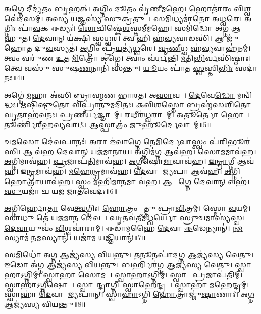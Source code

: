 𑌅\ul{𑌗𑍍𑌨𑍇} 𑌦𑍀𑌦𑍍𑌯॑𑌤𑌂 \ul{𑌬𑍃}𑌹𑌤𑍍।
\ul{𑌅}𑌗𑍍𑌨𑌿𑌂 \ul{𑌦𑍂}𑌤𑌂 𑌵𑍃॑𑌣𑍀𑌮𑌹𑍇।
𑌹𑍋𑌤𑌾॑𑌰𑌂 \ul{𑌵𑌿}𑌶𑍍𑌵𑌵𑍇॑𑌦𑌸𑌮𑍍।
\ul{𑌅}𑌸𑍍𑌯 \ul{𑌯}𑌜𑍍𑌞𑌸𑍍𑌯॑ \ul{𑌸𑍁}𑌕𑍍𑌰𑌤𑍁𑌮𑍍᳚।
\ul{𑌸}\ul{𑌮𑌿}𑌧𑍍𑌯𑌮𑌾॑𑌨𑍋 𑌅\ul{𑌧𑍍𑌵}𑌰𑍇।
\ul{𑌅}𑌗𑍍𑌨𑌿𑌃 𑌪𑌾॑\ul{𑌵}𑌕 𑌈𑌡𑍍𑌯𑌃॑।
\ul{𑌶𑍋}𑌚𑌿𑌷𑍍𑌕𑍇॑\ul{𑌶}𑌸𑍍𑌤𑌮𑍀॑𑌮𑌹𑍇।
𑌸𑌮𑌿॑𑌦𑍍𑌧𑍋 𑌅𑌗𑍍𑌨 𑌆𑌹𑍁𑌤।
\ul{𑌦𑍇}𑌵𑌾𑌨𑍍 𑌯॑𑌕𑍍𑌷𑌿 𑌸𑍍𑌵𑌧𑍍𑌵𑌰।
𑌤𑍍𑌵 𑌹𑌿 𑌹॑\ul{𑌵𑍍𑌯}𑌵𑌾𑌡𑌸𑌿॑।
𑌆 𑌜𑍁॑𑌹𑍋𑌤 𑌦𑍁\ul{𑌵}𑌸𑍍𑌯𑌤॑।
\ul{𑌅}𑌗𑍍𑌨𑌿𑌂 𑌪𑍍𑌰॑\ul{𑌯}𑌤𑍍𑌯॑\ul{𑌧𑍍𑌵}𑌰𑍇।
\ul{𑌵𑍃}\ul{𑌣𑍀}𑌧𑍍𑌵 𑌹॑\ul{𑌵𑍍𑌯}𑌵𑌾𑌹॑𑌨𑌮𑍍।
𑌤𑍍𑌵𑌂 𑌵𑌰𑍁॑𑌣 \ul{𑌉}𑌤 \ul{𑌮𑌿}𑌤𑍍𑌰𑍋 𑌅॑𑌗𑍍𑌨𑍇।
𑌤𑍍𑌵𑌾𑌂 𑌵॑𑌰𑍍𑌧𑌨𑍍𑌤𑌿 \ul{𑌮}𑌤𑌿\ul{𑌭𑌿}𑌰𑍍𑌵𑌸𑌿॑𑌷𑍍𑌠𑌾𑌃।
𑌤𑍍𑌵𑍇 𑌵𑌸𑍁॑ 𑌸𑍁𑌷\ul{𑌣}𑌨𑌾𑌨𑌿॑ 𑌸𑌨𑍍𑌤𑍁।
\ul{𑌯𑍂}𑌯𑌂 𑌪𑌾॑𑌤 \ul{𑌸𑍍𑌵}𑌸𑍍𑌤𑌿\ul{𑌭𑌿𑌃} 𑌸𑌦𑌾॑ 𑌨𑌃॥4॥\anuvakamend[\ul{𑌶𑍍𑌰}𑌵𑌾𑌯𑍍𑌯॑𑌮𑌿𑌧𑍀\ul{𑌮}𑌹𑍍𑌯𑌸𑌿॑ \ul{𑌸}𑌪𑍍𑌤 𑌚॑]

𑌅𑌗𑍍𑌨𑍇॑ \ul{𑌮}𑌹𑌾 𑌅॑𑌸𑌿 𑌬𑍍𑌰𑌾𑌹𑍍𑌮𑌣 𑌭𑌾𑌰𑌤।
𑌅\ul{𑌸𑌾}𑌵𑌸𑍗᳚।
\ul{𑌦𑍇}𑌵𑍇\ul{𑌦𑍍𑌧𑍋} 𑌮𑌨𑍍𑌵𑌿॑𑌦𑍍𑌧𑌃।
𑌋𑌷𑌿॑𑌷𑍍𑌟𑍁\ul{𑌤𑍋} 𑌵𑌿𑌪𑍍𑌰𑌾॑𑌨𑍁𑌮𑌦𑌿𑌤𑌃।
\ul{𑌕}\ul{𑌵𑌿}\ul{𑌶}𑌸𑍍𑌤𑍋 𑌬𑍍𑌰𑌹𑍍𑌮॑𑌸𑌶𑌿𑌤𑍋 \ul{𑌘𑍃}𑌤𑌾𑌹॑𑌵𑌨𑌃।
\ul{𑌪𑍍𑌰}𑌣𑍀\ul{𑌰𑍍𑌯}𑌜𑍍𑌞𑌾𑌨𑌾᳚𑌮𑍍।
\ul{𑌰}𑌥𑍀𑌰॑\ul{𑌧𑍍𑌵}𑌰𑌾𑌣𑌾᳚𑌮𑍍।
\ul{𑌅}𑌤𑍂\ul{𑌰𑍍𑌤𑍋} 𑌹𑍋𑌤𑌾᳚।
𑌤𑍂𑌰𑍍𑌣𑌿॑𑌰𑍍‌\mbox{}𑌹\ul{𑌵𑍍𑌯}𑌵𑌾𑌟𑍍।
𑌆𑌸𑍍𑌪𑌾𑌤𑍍𑌰𑌂॑ \ul{𑌜𑍁}𑌹𑍂\ul{𑌰𑍍𑌦𑍇}𑌵𑌾𑌨𑌾᳚𑌮𑍍॥5॥

\ul{𑌚}\ul{𑌮}𑌸𑍋 𑌦𑍇॑\ul{𑌵}𑌪𑌾𑌨𑌃॑।
\ul{𑌅}𑌰𑌾 𑌇॑𑌵𑌾𑌗𑍍𑌨𑍇 \ul{𑌨𑍇}𑌮𑌿\ul{𑌰𑍍𑌦𑍇}𑌵𑌾𑌸𑍍𑌤𑍍𑌵𑌂 𑌪॑\ul{𑌰𑌿}𑌭𑍂𑌰॑𑌸𑌿।
𑌆 𑌵॑𑌹 \ul{𑌦𑍇}𑌵𑌾𑌨𑍍 𑌯𑌜॑𑌮𑌾𑌨𑌾𑌯।
\ul{𑌅}𑌗𑍍𑌨𑌿𑌮॑\ul{𑌗𑍍𑌨} 𑌆𑌵॑𑌹।
𑌸𑍋\ul{𑌮}𑌮𑌾𑌵॑𑌹।
\ul{𑌅}𑌗𑍍𑌨𑌿𑌮𑌾𑌵॑𑌹।
\ul{𑌪𑍍𑌰}𑌜𑌾𑌪॑\ul{𑌤𑌿}𑌮𑌾𑌵॑𑌹।
\ul{𑌅}𑌗𑍍𑌨𑍀𑌷𑍋\ul{𑌮𑌾}𑌵𑌾𑌵॑𑌹।
\ul{𑌇}\ul{𑌨𑍍𑌦𑍍𑌰𑌾}𑌗𑍍𑌨𑍀 𑌆𑌵॑𑌹।
𑌇\ul{𑌨𑍍𑌦𑍍𑌰}𑌮𑌾𑌵॑𑌹।
\ul{𑌮}\ul{𑌹𑍇}𑌨𑍍𑌦𑍍𑌰𑌮𑌾𑌵॑𑌹।
\ul{𑌦𑍇}𑌵𑌾 𑌆᳚\ul{𑌜𑍍𑌯}𑌪𑌾 𑌆𑌵॑𑌹।
\ul{𑌅}𑌗𑍍𑌨𑌿 \ul{𑌹𑍋}𑌤𑍍𑌰𑌾𑌯𑌾𑌵॑𑌹।
𑌸𑍍𑌵𑌂 𑌮॑\ul{𑌹𑌿}𑌮𑌾\ul{𑌨}𑌮𑌾 𑌵॑𑌹।
𑌆 𑌚𑌾᳚𑌗𑍍𑌨𑍇 \ul{𑌦𑍇}𑌵𑌾𑌨𑍍 𑌵𑌹॑।
\ul{𑌸𑍁}𑌯𑌜𑌾॑ 𑌚 𑌯𑌜 𑌜𑌾𑌤𑌵𑍇𑌦𑌃॥6॥\anuvakamend[\ul{𑌦𑍇}𑌵𑌾\ul{𑌨𑌾}𑌮𑌿\ul{𑌨𑍍𑌦𑍍𑌰}𑌮𑌾 𑌵॑\ul{𑌹} 𑌷𑌟𑍍 𑌚॑]

\ul{𑌅}𑌗𑍍𑌨𑌿𑌰𑍍\mbox{}𑌹𑍋\ul{𑌤𑌾} 𑌵𑍇\ul{𑌤𑍍𑌵}𑌗𑍍𑌨𑌿𑌃।
\ul{𑌹𑍋}𑌤𑍍𑌰𑌂 𑌵𑍇᳚𑌤𑍍𑌤𑍁 𑌪𑍍𑌰𑌾\ul{𑌵𑌿}𑌤𑍍𑌰𑌮𑍍।
𑌸𑍍𑌮𑍋 \ul{𑌵}𑌯𑌮𑍍।
\ul{𑌸𑌾}𑌧𑍁 𑌤𑍇॑ 𑌯𑌜𑌮𑌾𑌨 \ul{𑌦𑍇}𑌵𑌤𑌾᳚।
\ul{𑌘𑍃}𑌤𑌵॑𑌤𑍀𑌮𑌧𑍍𑌵\ul{𑌰𑍍𑌯𑍋} 𑌸𑍍𑌰𑍁\ul{𑌚}𑌮𑌾𑌸𑍍𑌯॑𑌸𑍍𑌵।
\ul{𑌦𑍇}\ul{𑌵𑌾}𑌯𑍁𑌵𑌂॑ \ul{𑌵𑌿}𑌶𑍍𑌵𑌵𑌾॑𑌰𑌾𑌮𑍍।
𑌈𑌡𑌾॑𑌮𑌹𑍈 \ul{𑌦𑍇}𑌵𑌾 \ul{𑌈}𑌡𑍇𑌨𑍍𑌯𑌾𑌨𑍍॑।
\ul{𑌨}\ul{𑌮}𑌸𑍍𑌯𑌾𑌮॑ 𑌨\ul{𑌮}𑌸𑍍𑌯𑌾𑌨𑍍॑।
𑌯𑌜𑌾॑𑌮 \ul{𑌯}𑌜𑍍𑌞𑌿𑌯𑌾𑌨𑍍॑॥7॥\anuvakamend[\ul{𑌅}𑌗𑍍𑌨𑌿𑌰𑍍‌\mbox{}𑌹𑍋\ul{𑌤𑌾} 𑌨𑌵॑]

\ul{𑌸}𑌮𑌿𑌧𑍋॑ 𑌅\ul{𑌗𑍍𑌨} 𑌆𑌜𑍍𑌯॑𑌸𑍍𑌯 𑌵𑌿𑌯𑌨𑍍𑌤𑍁।
𑌤\ul{𑌨𑍂}𑌨𑌪𑌾॑𑌦\ul{𑌗𑍍𑌨} 𑌆𑌜𑍍𑌯॑𑌸𑍍𑌯 𑌵𑍇𑌤𑍁।
\ul{𑌇}𑌡𑍋 𑌅॑\ul{𑌗𑍍𑌨} 𑌆𑌜𑍍𑌯॑𑌸𑍍𑌯 𑌵𑌿𑌯𑌨𑍍𑌤𑍁।
\ul{𑌬}\ul{𑌰𑍍}𑌹𑌿𑌰॑\ul{𑌗𑍍𑌨} 𑌆𑌜𑍍𑌯॑𑌸𑍍𑌯 𑌵𑍇𑌤𑍁।
𑌸𑍍𑌵𑌾\ul{𑌹𑌾}\-𑌽𑌗𑍍𑌨𑌿𑌮𑍍।
𑌸𑍍𑌵𑌾\ul{𑌹𑌾} 𑌸𑍋𑌮𑌮𑍍᳚।
𑌸𑍍𑌵𑌾\ul{𑌹𑌾}\-𑌽𑌗𑍍𑌨𑌿𑌮𑍍।
𑌸𑍍𑌵𑌾𑌹𑌾᳚ \ul{𑌪𑍍𑌰}𑌜𑌾𑌪॑𑌤𑌿𑌮𑍍।
𑌸𑍍𑌵𑌾\ul{𑌹𑌾}\-𑌽𑌗𑍍𑌨𑍀𑌷𑍋𑌮𑍗᳚।
𑌸𑍍𑌵𑌾𑌹𑍇᳚\ul{𑌨𑍍𑌦𑍍𑌰𑌾}𑌗𑍍𑌨𑍀।
𑌸𑍍𑌵𑌾𑌹𑍇𑌨𑍍𑌦𑍍𑌰𑌮𑍍᳚।
𑌸𑍍𑌵𑌾𑌹𑌾॑ 𑌮\ul{𑌹𑍇}𑌨𑍍𑌦𑍍𑌰𑌮𑍍।
𑌸𑍍𑌵𑌾𑌹𑌾॑ \ul{𑌦𑍇}𑌵𑌾 𑌆᳚\ul{𑌜𑍍𑌯}𑌪𑌾𑌨𑍍।
𑌸𑍍𑌵𑌾\ul{𑌹𑌾}\-𑌽𑌗𑍍𑌨𑌿 \ul{𑌹𑍋}𑌤𑍍𑌰𑌾𑌜𑍍𑌜𑍁॑\ul{𑌷𑌾}𑌣𑌾𑌃।
𑌅\ul{𑌗𑍍𑌨} 𑌆𑌜𑍍𑌯॑𑌸𑍍𑌯 𑌵𑌿𑌯𑌨𑍍𑌤𑍁॥8॥\anuvakamend[\ul{𑌇}\ul{𑌨𑍍𑌦𑍍𑌰𑌾}𑌗𑍍𑌨𑍀 𑌪𑌞𑍍𑌚॑ 𑌚]

